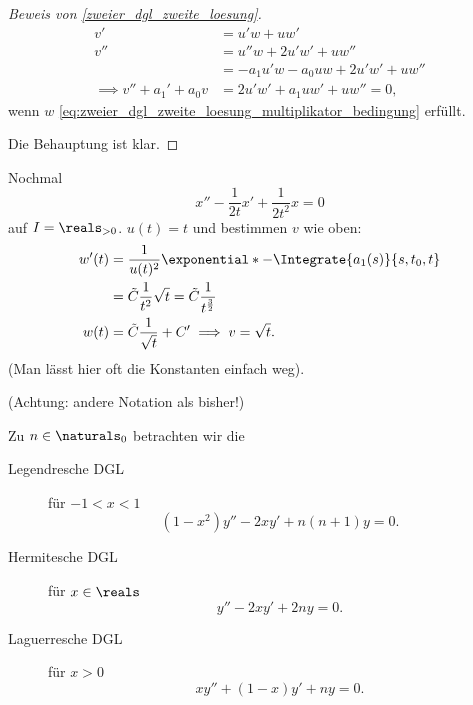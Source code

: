 \begin{proof}[Beweis von \ref{zweier_dgl_zweite_loesung}]
  \begin{align*}
    v'&=u'w+uw'\\
    v''&=u''w+2u'w'+uw''\\
    &=-a_1u'w-a_0uw+2u'w'+uw''\\
    \implies v''+a_1'+a_0v&=2u'w'+a_1uw'+uw''=0,
  \end{align*}
  wenn \( w \) \eqref{eq:zweier_dgl_zweite_loesung_multiplikator_bedingung} erfüllt.

  Die  Behauptung ist klar.
\end{proof}
\begin{beispiel*}
  Nochmal
  \begin{equation*}
    x''-\frac{1}{2t}x'+\frac{1}{2t^2}x=0
  \end{equation*}
auf \( I=\reals_{>0} \). \( u(t)=t \) und bestimmen \( v \) wie oben:
\begin{align*}
  w'(t)&=\frac{1}{u(t)^2}\exponential*{-\Integrate{a_1(s)}{s,t_0,t}}\\
  &=\tilde{C}\frac{1}{t^2}\sqrt{t}=\tilde{C}\frac{1}{t^{\frac{3}{2}}}\\
  w(t)&=\tilde{C}\frac{1}{\sqrt{t}}+C'\implies v=\sqrt{t}.
\end{align*}
(Man lässt hier oft die Konstanten einfach weg).
\end{beispiel*}
\begin{blank}[Besondere DGL'n mit \( k=2 \), \( n=1 \)]\label{besondere_dlgs}
  (Achtung: andere Notation als bisher!)

  Zu \( n\in \naturals_0 \) betrachten wir die 
  \begin{description}
    \item[Legendresche DGL] für \( -1<x<1 \)
    \begin{equation*}
      (1-x^2)y''-2xy'+n(n+1)y=0.
    \end{equation*}
    \item[Hermitesche DGL] für \( x\in \reals \)
    \begin{equation*}
      y''-2xy'+2ny=0.
    \end{equation*}
    \item[Laguerresche DGL] für \( x>0 \)
    \begin{equation*}
      xy''+(1-x)y'+ny=0.
    \end{equation*}
  \end{description}
\end{blank}
